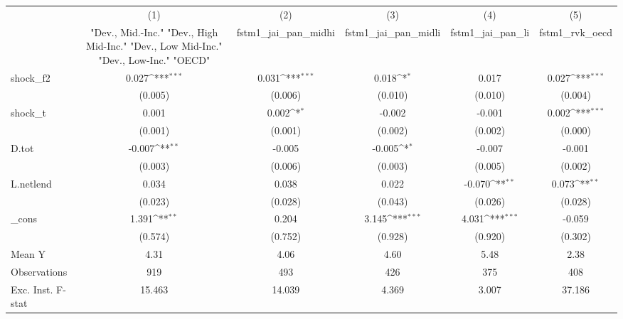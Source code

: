 {
\def\sym#1{\ifmmode^{#1}\else\(^{#1}\)\fi}
\begin{tabular}{l*{5}{c}}
\toprule
            &\multicolumn{1}{c}{(1)}&\multicolumn{1}{c}{(2)}&\multicolumn{1}{c}{(3)}&\multicolumn{1}{c}{(4)}&\multicolumn{1}{c}{(5)}\\
            &\multicolumn{1}{c}{ "Dev., Mid.-Inc." "Dev., High Mid-Inc." "Dev., Low Mid-Inc." "Dev., Low-Inc." "OECD" }&\multicolumn{1}{c}{fstm1\_jai\_pan\_midhi}&\multicolumn{1}{c}{fstm1\_jai\_pan\_midli}&\multicolumn{1}{c}{fstm1\_jai\_pan\_li}&\multicolumn{1}{c}{fstm1\_rvk\_oecd}\\
\midrule
shock\_f2    &       0.027\sym{***}&       0.031\sym{***}&       0.018\sym{*}  &       0.017         &       0.027\sym{***}\\
            &     (0.005)         &     (0.006)         &     (0.010)         &     (0.010)         &     (0.004)         \\
\addlinespace
shock\_t     &       0.001         &       0.002\sym{*}  &      -0.002         &      -0.001         &       0.002\sym{***}\\
            &     (0.001)         &     (0.001)         &     (0.002)         &     (0.002)         &     (0.000)         \\
\addlinespace
D.tot       &      -0.007\sym{**} &      -0.005         &      -0.005\sym{*}  &      -0.007         &      -0.001         \\
            &     (0.003)         &     (0.006)         &     (0.003)         &     (0.005)         &     (0.002)         \\
\addlinespace
L.netlend   &       0.034         &       0.038         &       0.022         &      -0.070\sym{**} &       0.073\sym{**} \\
            &     (0.023)         &     (0.028)         &     (0.043)         &     (0.026)         &     (0.028)         \\
\addlinespace
\_cons      &       1.391\sym{**} &       0.204         &       3.145\sym{***}&       4.031\sym{***}&      -0.059         \\
            &     (0.574)         &     (0.752)         &     (0.928)         &     (0.920)         &     (0.302)         \\
\midrule
Mean Y      &        4.31         &        4.06         &        4.60         &        5.48         &        2.38         \\
Observations&         919         &         493         &         426         &         375         &         408         \\
Exc. Inst. F-stat&      15.463         &      14.039         &       4.369         &       3.007         &      37.186         \\
\bottomrule
\end{tabular}
}
